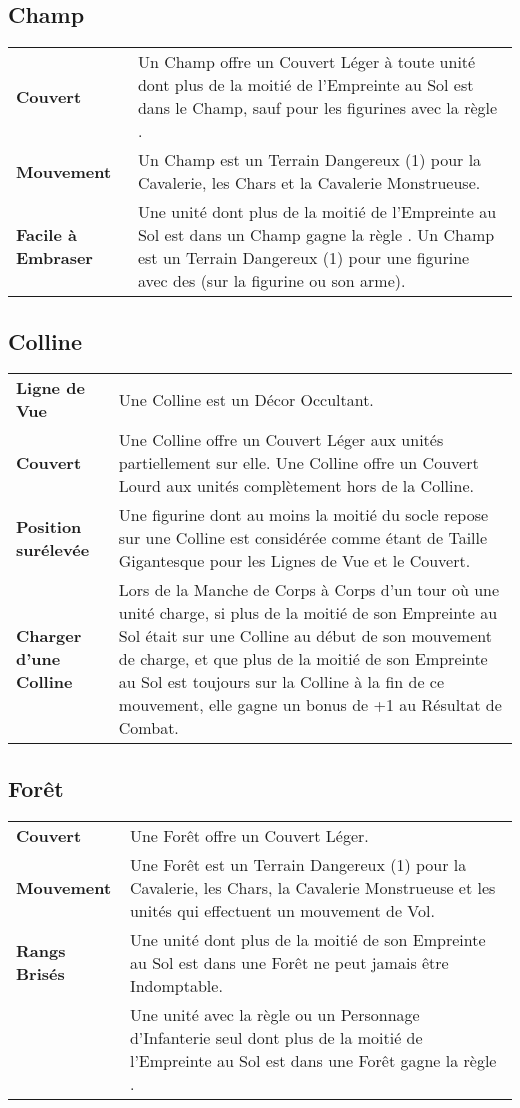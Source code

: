 \hypertarget{fields}{\subsection{Champ}}

\noindent\begin{tabular}{>{\bfseries\raggedleft}p{2.2cm}p{13.5cm}}
Couvert & Un Champ offre un Couvert Léger à toute unité dont plus de la moitié de l'Empreinte au Sol est dans le Champ, sauf pour les figurines avec la règle \toweringpresence{}. \tabularnewline
Mouvement & Un Champ est un Terrain Dangereux (1) pour la Cavalerie, les Chars et la Cavalerie Monstrueuse. \tabularnewline
Facile à Embraser & Une unité dont plus de la moitié de l'Empreinte au Sol est dans un Champ gagne la règle \flammable{}. Un Champ est un Terrain Dangereux (1) pour une figurine avec des \flamingattacks{} (sur la figurine ou son arme). \tabularnewline
\end{tabular}

\hypertarget{hills}{\subsection{Colline}}

\noindent\begin{tabular}{>{\bfseries\raggedleft}p{2.2cm}p{13.5cm}}
Ligne de Vue & Une Colline est un Décor Occultant. \tabularnewline
Couvert & Une Colline offre un Couvert Léger aux unités partiellement sur elle.\newline
Une Colline offre un Couvert Lourd aux unités complètement hors de la Colline. \tabularnewline
Position surélevée & Une figurine dont au moins la moitié du socle repose sur une Colline est considérée comme étant de Taille Gigantesque pour les Lignes de Vue et le Couvert. \tabularnewline
Charger d'une Colline & Lors de la Manche de Corps à Corps d'un tour où une unité charge, si plus de la moitié de son Empreinte au Sol était sur une Colline au début de son mouvement de charge, et que plus de la moitié de son Empreinte au Sol est toujours sur la Colline à la fin de ce mouvement, elle gagne un bonus de +1 au Résultat de Combat. \tabularnewline
\end{tabular}

\hypertarget{forests}{\subsection{Forêt}}

\noindent\begin{tabular}{>{\bfseries\raggedleft}p{2.2cm}p{13.5cm}}
Couvert & Une Forêt offre un Couvert Léger. \tabularnewline
Mouvement & Une Forêt est un Terrain Dangereux (1) pour la Cavalerie, les Chars, la Cavalerie Monstrueuse et les unités qui effectuent un mouvement de Vol. \tabularnewline
Rangs Brisés & Une unité dont plus de la moitié de son Empreinte au Sol est dans une Forêt ne peut jamais être Indomptable. \tabularnewline
\stubborn{} & Une unité avec la règle \skirmisher{} ou un Personnage d'Infanterie seul dont plus de la moitié de l'Empreinte au Sol est dans une Forêt gagne la règle \stubborn{}. \tabularnewline
\end{tabular}

